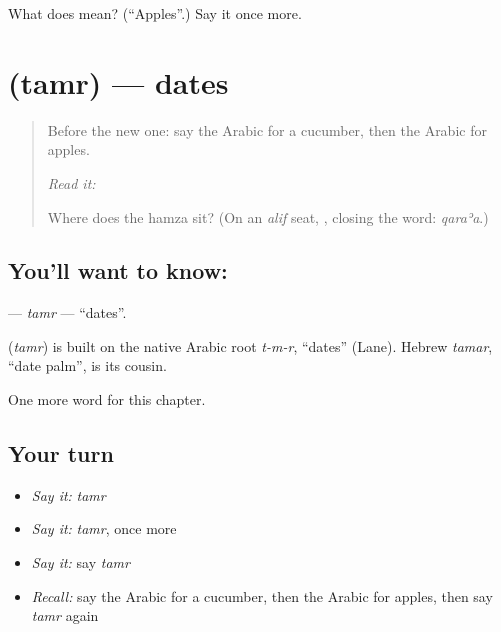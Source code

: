 \begin{tcolorbox}[breakable,colback=teal!4,colframe=teal!35!black,title={Before you move on}]
What does  mean? (\textquotedblleft{}Apples\textquotedblright{}.) Say it once more.
\end{tcolorbox}
\section[\texorpdfstring{\ar{تمر} (tamr)}{تمر (tamr)}]{ (tamr) — dates}

\label{lesson:AR-C129-tamr}



\begin{quote}
Before the new one: say the Arabic for a cucumber, then the Arabic for apples.

\emph{Read it:} \textbf{}

Where does the hamza sit? (On an \emph{alif} seat, \textbf{}, closing the word: \emph{qaraʾa}.)
\end{quote}

\subsection*{You'll want to know: }
\textbf{} — \emph{tamr} — \textquotedblleft{}dates\textquotedblright{}.

\begin{cousinweb}
\textbf{} (\emph{tamr}) is built on the native Arabic root \emph{t-m-r}, \textquotedblleft{}dates\textquotedblright{} (Lane). Hebrew \emph{tamar}, \textquotedblleft{}date palm\textquotedblright{}, is its cousin.
\end{cousinweb}

\begin{grammarlens}[title={What you've built}]
One more word for this chapter.
\end{grammarlens}

\subsection*{Your turn}
\begin{itemize}
\raggedright
  \item \emph{Say it:} \emph{tamr}
  \item \emph{Say it:} \emph{tamr}, once more
  \item \emph{Say it:} say \emph{tamr}
  \item \emph{Recall:} say the Arabic for a cucumber, then the Arabic for apples, then say \emph{tamr} again
\end{itemize}

